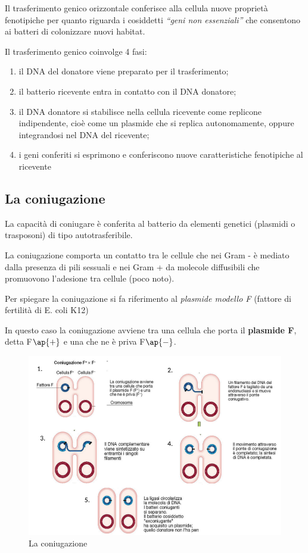 \documentclass[11pt]{book}
\begin{document}
Il trasferimento genico orizzontale conferisce alla cellula nuove proprietà fenotipiche per quanto riguarda i cosiddetti \emph{``geni non essenziali''} che consentono ai batteri di colonizzare nuovi habitat.

Il trasferimento genico coinvolge 4 fasi: 
\begin{enumerate}
\item il DNA del donatore viene preparato per il trasferimento;
\item il batterio ricevente entra in contatto con il DNA donatore;
\item il DNA donatore si stabilisce nella cellula ricevente come replicone indipendente, cioè come un plasmide che si replica autonomamente, oppure integrandosi nel DNA del ricevente;
\item i geni conferiti si esprimono e conferiscono nuove caratteristiche fenotipiche al ricevente
\end{enumerate}

\subsection{La coniugazione} 
La capacità di coniugare è conferita al batterio da elementi genetici (plasmidi o trasposoni) di tipo autotrasferibile.

La coniugazione comporta un contatto tra le cellule che nei Gram - è mediato dalla presenza di pili sessuali e nei Gram + da molecole diffusibili che promuovono l’adesione tra cellule (poco noto).
 
Per spiegare la coniugazione si fa riferimento al \emph{plasmide modello F} (fattore di fertilità di E. coli K12)

In questo caso la coniugazione avviene tra una cellula che porta il \textbf{plasmide F}, detta F$\ap{+}$ e una che ne è priva F$\ap{-}$.

\clearpage
\begin{figure}[htp]
\centering
\includegraphics[scale=0.5]{img/La coniugazione.png}
\caption{La coniugazione}
\label{}
\end{figure}
\end{document}
